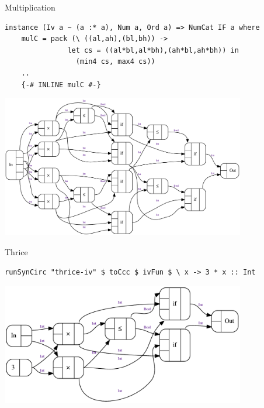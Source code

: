 \documentclass[10pt]{beamer}
\theoremstyle{definition}
\theoremstyle{remark}
\numberwithin{equation}{section}
\begin{document}
\begin{frame}[fragile]{Multiplication}
  \begin{lstlisting}[frame=single]
  instance (Iv a ~ (a :* a), Num a, Ord a) => NumCat IF a where
    mulC = pack (\ ((al,ah),(bl,bh)) ->
               let cs = ((al*bl,al*bh),(ah*bl,ah*bh)) in
                 (min4 cs, max4 cs))
    ..
    {-# INLINE mulC #-}
  \end{lstlisting}
  \begin{center}
    \includegraphics[width=0.8\textwidth]{mul-iv.pdf}
  \end{center}
\end{frame}

\begin{frame}[fragile]{Thrice}
  \begin{lstlisting}[frame=single]
     runSynCirc "thrice-iv" $ toCcc $ ivFun $ \ x -> 3 * x :: Int
  \end{lstlisting}
  \begin{center}
    \includegraphics[width=0.8\textwidth]{thrice-iv.pdf}
  \end{center}
\end{frame}
\end{document}
